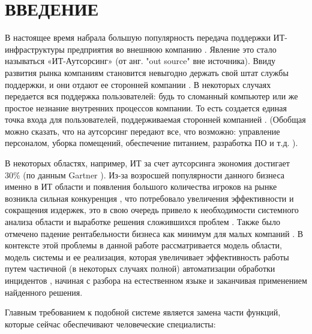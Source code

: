 \chapter*{ВВЕДЕНИЕ}							%

В настоящее время набрала большую популярность передача поддержки ИТ-инфраструктуры предприятия во внешнюю компанию \cite{StartToOutsource}. Явление это стало называться «ИТ-Аутсорсинг» (от анг. "out source" \- вне источника). Ввиду развития рынка компаниям становится невыгодно держать свой штат службы поддержки, и они отдают ее сторонней компании \cite{OutsourceEff}. В некоторых случаях передается вся поддержка пользователей: будь то сломанный компьютер или же простое незнание внутренних процессов компании. То есть создается единая точка входа для пользователей, поддерживаемая сторонней компанией \cite{OutsourceSD}. (Обобщая можно сказать, что на аутсорсинг передают все, что возможно: управление персоналом, уборка помещений, обеспечение питанием, разработка ПО \cite{OutsourceSoft} и т.д. ).\par
В некоторых областях, например, ИТ за счет аутсорсинга экономия достигает 30\% (по данным Gartner \cite{OutsourceIT}).
Из-за возросшей популярности данного бизнеса именно в ИТ области и появления большого количества игроков на рынке возникла сильная конкуренция \cite{AUTOS-1}, что потребовало увеличения эффективности и сокращения издержек, это в свою очередь привело к необходимости системного анализа области и выработке решения сложившихся проблем \cite{AUTOM-1}. Также было отмечено падение рентабельности бизнеса как минимум для малых компаний \cite{OUTSOURCE-RENT} \cite{OutsourceEff}. В контексте этой проблемы в данной работе рассматривается модель области, модель системы и ее реализация, которая увеличивает эффективность работы путем частичной (в некоторых случаях полной) автоматизации обработки инцидентов \cite{SDAUTOM}, начиная с разбора на естественном языке и заканчивая применением найденного решения. \par
Главным требованием к подобной системе является замена части функций, которые сейчас обеспечивают человеческие специалисты:
